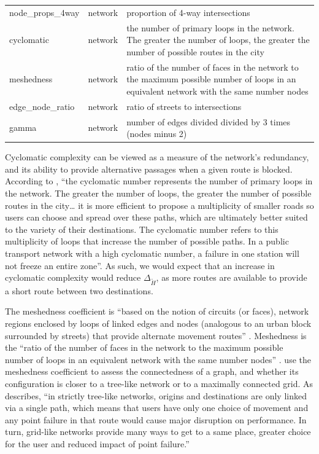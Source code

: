\documentclass[
  10pt,
]{article}
\begin{document}
\begin{longtable}{l|l|p{8cm}}
        node\_props\_4way &  network &                                                                                                       proportion of 4-way intersections \\
               cyclomatic &  network &      the number of primary loops in the network. The greater the number of loops, the greater the number of possible routes in the city \\
               meshedness &  network & ratio of the number of faces in the network to the maximum possible number of loops in an equivalent network with the same number nodes \\
        edge\_node\_ratio &  network &                                                                                                       ratio of streets to intersections \\
                    gamma &  network &                                                                             number of edges divided divided by 3 times (nodes minus 2)  \\
\end{longtable}

Cyclomatic complexity can be viewed as a measure of the network's
redundancy, and its ability to provide alternative passages when a given
route is blocked. According to
\citet[p.599]{bourdic2012AssessingCities}, ``the cyclomatic number
represents the number of primary loops in the network. The greater the
number of loops, the greater the number of possible routes in the
city\ldots{} it is more efficient to propose a multiplicity of smaller
roads so users can choose and spread over these paths, which are
ultimately better suited to the variety of their destinations. The
cyclomatic number refers to this multiplicity of loops that increase the
number of possible paths. In a public transport network with a high
cyclomatic number, a failure in one station will not freeze an entire
zone''. As such, we would expect that an increase in cyclomatic
complexity would reduce \(\Delta_{\tilde{H}}\), as more routes are
available to provide a short route between two destinations.

The meshedness coefficient is ``based on the notion of circuits (or
faces), network regions enclosed by loops of linked edges and nodes
(analogous to an urban block surrounded by streets) that provide
alternate movement routes'' \citep{feliciotti2018ResilienceUrban}.
Meshedness is the ``ratio of the number of faces in the network to the
maximum possible number of loops in an equivalent network with the same
number nodes'' \citep{fleischmann2022EvolutionUrban}.
\citet{buhl2006TopologicalPatterns} use the meshedness coefficient to
assess the connectedness of a graph, and whether its configuration is
closer to a tree-like network or to a maximally connected grid. As
\citet{feliciotti2018ResilienceUrban} describes, ``in strictly tree-like
networks, origins and destinations are only linked via a single path,
which means that users have only one choice of movement and any point
failure in that route would cause major disruption on performance. In
turn, grid-like networks provide many ways to get to a same place,
greater choice for the user and reduced impact of point failure.''
\end{document}
